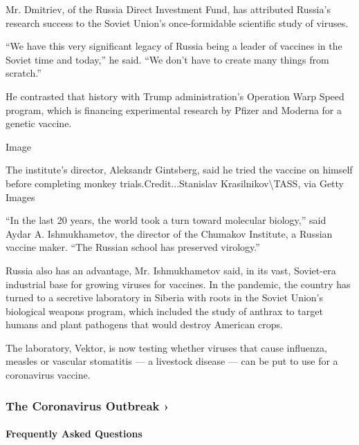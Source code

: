 Mr. Dmitriev, of the Russia Direct Investment Fund, has attributed
Russia's research success to the Soviet Union's once-formidable
scientific study of viruses.

``We have this very significant legacy of Russia being a leader of
vaccines in the Soviet time and today,'' he said. ``We don't have to
create many things from scratch.''

He contrasted that history with Trump administration's Operation Warp
Speed program, which is financing experimental research by Pfizer and
Moderna for a genetic vaccine.

Image

The institute's director, Aleksandr Gintsberg, said he tried the vaccine
on himself before completing monkey trials.Credit...Stanislav
Krasilnikov\textbackslash{}TASS, via Getty Images

``In the last 20 years, the world took a turn toward molecular
biology,'' said Aydar A. Ishmukhametov, the director of the Chumakov
Institute, a Russian vaccine maker. ``The Russian school has preserved
virology.''

Russia also has an advantage, Mr. Ishmukhametov said, in its vast,
Soviet-era industrial base for growing viruses for vaccines. In the
pandemic, the country has turned to a secretive laboratory in Siberia
with roots in the Soviet Union's biological weapons program, which
included the study of anthrax to target humans and plant pathogens that
would destroy American crops.

The laboratory, Vektor, is now testing whether viruses that cause
influenza, measles or vascular stomatitis --- a livestock disease ---
can be put to use for a coronavirus vaccine.

\href{https://www.nytimes3xbfgragh.onion/news-event/coronavirus?action=click\&pgtype=Article\&state=default\&region=MAIN_CONTENT_3\&context=storylines_faq}{}

\hypertarget{the-coronavirus-outbreak-}{%
\subsubsection{The Coronavirus Outbreak
›}\label{the-coronavirus-outbreak-}}

\hypertarget{frequently-asked-questions}{%
\paragraph{Frequently Asked
Questions}\label{frequently-asked-questions}}

